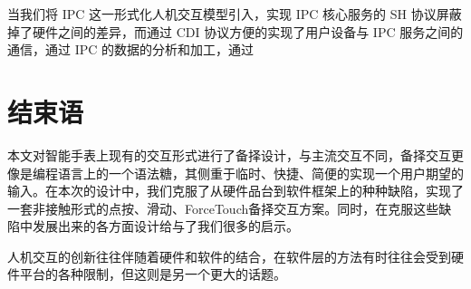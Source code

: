 当我们将 IPC 这一形式化人机交互模型引入，实现 IPC 核心服务的 SH 协议屏蔽掉了硬件之间的差异，而通过 CDI 协议方便的实现了用户设备与 IPC 服务之间的通信，通过 IPC 的数据的分析和加工，通过


\section{结束语}

本文对智能手表上现有的交互形式进行了备择设计，与主流交互不同，备择交互更像是编程语言上的一个语法糖，其侧重于临时、快捷、简便的实现一个用户期望的输入。在本次的设计中，我们克服了从硬件品台到软件框架上的种种缺陷，实现了一套非接触形式的点按、滑动、ForceTouch备择交互方案。同时，在克服这些缺陷中发展出来的各方面设计给与了我们很多的启示。

人机交互的创新往往伴随着硬件和软件的结合，在软件层的方法有时往往会受到硬件平台的各种限制，但这则是另一个更大的话题。

